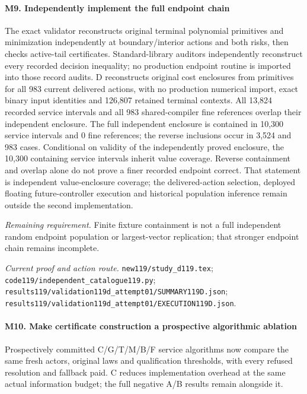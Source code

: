 \paragraph{M9. Independently implement the full endpoint chain}

The exact validator reconstructs original terminal polynomial primitives and minimization independently at boundary/\allowbreak{}interior actions and both risks, then checks active-tail certificates. Standard-library auditors independently reconstruct every recorded decision inequality; no production endpoint routine is imported into those record audits. D reconstructs original cost enclosures from primitives for all 983 current delivered actions, with no production numerical import, exact binary input identities and 126,807 retained terminal contexts. All 13,824 recorded service intervals and all 983 shared-compiler fine references overlap their independent enclosure. The full independent enclosure is contained in 10,300 service intervals and 0 fine references; the reverse inclusions occur in 3,524 and 983 cases. Conditional on validity of the independently proved enclosure, the 10,300 containing service intervals inherit value coverage. Reverse containment and overlap alone do not prove a finer recorded endpoint correct. That statement is independent value-enclosure coverage; the delivered-action selection, deployed floating future-controller execution and historical population inference remain outside the second implementation.

\par\emph{Remaining requirement.} Finite fixture containment is not a full independent random endpoint population or largest-vector replication; that stronger endpoint chain remains incomplete.

\par\emph{Current proof and action route.} \nolinkurl{new119/study_d119.tex}; \nolinkurl{code119/independent_catalogue119.py}; \nolinkurl{results119/validation119d_attempt01/SUMMARY119D.json}; \nolinkurl{results119/validation119d_attempt01/EXECUTION119D.json}.

\paragraph{M10. Make certificate construction a prospective algorithmic ablation}

Prospectively committed C/\allowbreak{}G/\allowbreak{}T/\allowbreak{}M/\allowbreak{}B/\allowbreak{}F service algorithms now compare the same fresh actors, original laws and qualification thresholds, with every refused resolution and fallback paid. C reduces implementation overhead at the same actual information budget; the full negative A/\allowbreak{}B results remain alongside it.

